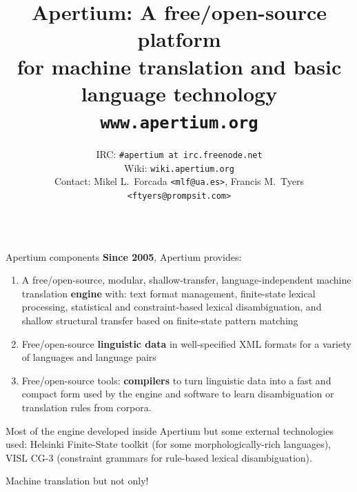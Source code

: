 \documentclass[final]{beamer} %
\title{Apertium: A free/open-source platform \\ for machine translation and basic language technology \\[5mm]
\texttt{www.apertium.org}}
\author{IRC: \texttt{\#apertium at irc.freenode.net} \\
Wiki: \texttt{wiki.apertium.org} \\
Contact: Mikel L.\ Forcada \texttt{<mlf@ua.es>}, Francis M.\ Tyers \texttt{<ftyers@prompsit.com>}}
\institute{~}
\newlength{\wideitemsep}
\let\olditem\item
\renewcommand{\item}{\setlength{\itemsep}{\wideitemsep}\olditem}
\begin{document}
\begin{frame}
\begin{columns}
\begin{column}{1\textwidth}

\begin{block}{Apertium components}
\textbf{Since 2005}, Apertium provides:
\begin{enumerate}
\item A free/open-source, modular, shallow-transfer, language-independent machine translation \textbf{engine} with:  text format management, finite-state lexical processing, statistical and constraint-based lexical disambiguation, and shallow structural transfer based on finite-state pattern matching 
\item Free/open-source \textbf{linguistic data} in well-specified XML formats for a   variety of languages and language pairs 
\item Free/open-source tools: \textbf{compilers} to turn linguistic
  data into a fast and compact form used by the engine and software to
  learn disambiguation or translation rules from corpora.
\end{enumerate}

Most of the engine developed inside Apertium but some external technologies used: Helsinki Finite-State toolkit (for some morphologically-rich languages), VISL CG-3 (constraint grammars for rule-based lexical disambiguation).

\end{block}

\begin{block}{Machine translation but not only!}


\end{block}
\end{column}
\end{columns}
\end{frame}
\end{document}
